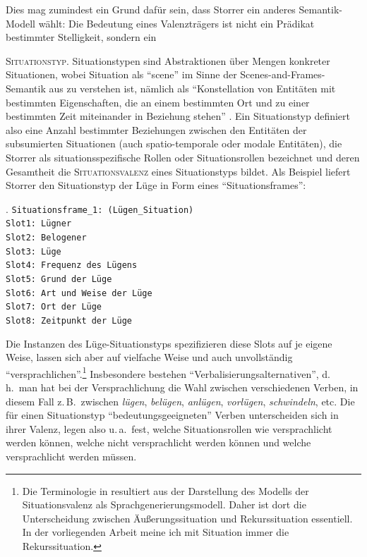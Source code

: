 Dies mag zumindest ein Grund dafür sein, dass Storrer ein anderes Semantik-Modell wählt: Die Bedeutung eines Valenzträgers ist nicht ein Prädikat bestimmter Stelligkeit, sondern ein {\textsc{Situationstyp}. Situationstypen sind Abstraktionen über Mengen konkreter Situationen, wobei Situation als "`scene"' im Sinne der Scenes-and-Frames-Semantik aus \cite{Fillmore:77,Fillmore:77b} zu verstehen ist, nämlich als "`Konstellation von Entitäten mit bestimmten Eigenschaften, die an einem bestimmten Ort und zu einer bestimmten Zeit miteinander in Beziehung stehen"' \citep[232]{Storrer:96}. Ein Situationstyp definiert also eine Anzahl bestimmter Beziehungen zwischen den Entitäten der subsumierten Situationen (auch spatio-temporale oder modale Entitäten), die Storrer als situationsspezifische Rollen oder Situationsrollen bezeichnet und deren Gesamtheit die \textsc{Situationsvalenz} eines Situationstyps bildet. Als Beispiel liefert Storrer den Situationstyp der Lüge in Form eines "`Situationsframes"': 

\ex. \label{ex-storrer-lüge} {\tt Situationsframe\_1: (Lügen\_Situation) \\[1.5ex] 
Slot1: Lügner \\
Slot2: Belogener \\
Slot3: Lüge \\
Slot4: Frequenz des Lügens \\
Slot5: Grund der Lüge \\
Slot6: Art und Weise der Lüge \\
Slot7: Ort der Lüge \\
Slot8: Zeitpunkt der Lüge \\[1.5ex]
}
\citep[286]{Storrer:92}

Die Instanzen des Lüge-Situationstyps spezifizieren diese Slots auf je eigene Weise, lassen sich aber auf vielfache Weise und auch unvollständig "`versprachlichen"'.\footnote{Die Terminologie in \cite{Storrer:92,Storrer:96} resultiert aus der Darstellung des Modells der Situationsvalenz als Sprachgenerierungsmodell. Daher ist dort die Unterscheidung zwischen Äu\ss erungssituation und Rekurssituation essentiell. In der vorliegenden Arbeit meine ich mit Situation immer die Rekurssituation.} Insbesondere bestehen "`Verbalisierungsalternativen"', d.\,h.\ man hat bei der Versprachlichung die Wahl zwischen verschiedenen Verben, in diesem Fall z.\,B.\ zwischen {\it lügen}, {\it belügen}, {\it anlügen}, {\it vorlügen}, {\it schwindeln}, etc. Die für einen Situationstyp "`bedeutungsgeeigneten"' Verben unterscheiden sich in ihrer Valenz, legen also u.\,a.\ fest, welche Situationsrollen wie versprachlicht werden können, welche nicht versprachlicht werden können und welche versprachlicht werden müssen. 

}
